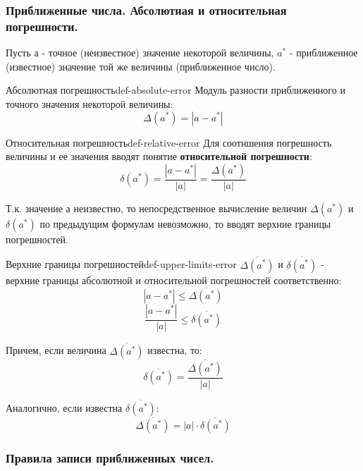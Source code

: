\documentclass[14pt]{extarticle}
\begin{document}
    \clearpage
    \subsubsection{Приближенные числа. Абсолютная и относительная погрешности.}
        
        Пусть $а$ - точное (неизвестное) значение некоторой величины, $a^{*}$ - приближенное (известное) значение той же величины (приближенное число).

        \begin{definition}{Абсолютная погрешность}{def-absolute-error}
            Модуль разности приближенного и точного значения некоторой величины:
            $$\Delta(a^{*}) = |a - a^{*}|$$
        \end{definition}

        \begin{definition}{Относительная погрешность}{def-relative-error}
            Для соотншения погрешность величины и ее значения вводят понятие \textbf{относительной погрешности}:
            $$\delta(a^{*}) = \frac{|a - a^{*}|}{|a|} = \frac{\Delta(a^{*})}{|a|}$$
        \end{definition}

        Т.к. значение $а$ неизвестно, то непосредственное вычисление величин $\Delta(a^{*})$ и $\delta(a^{*})$ по предыдущим формулам невозможно, то вводят верхние границы погрешностей.

        \begin{definition}{Верхние границы погрешностей}{def-upper-limits-error}
            $\overline{\Delta(a^{*})}$ и $\overline{\delta(a^{*})}$ - верхние границы абсолютной и относительной погрешностей соответственно:
            $$|a - a^{*}| \leq \overline{\Delta(a^{*})}$$
            $$\frac{|a - a^{*}|}{|a|} \leq \overline{\delta(a^{*})}$$

            Причем, если величина $\overline{\Delta(a^{*})}$ известна, то:
            $$\overline{\delta(a^{*})} = \frac{\overline{\Delta(a^{*})}}{|a|}$$

            Аналогично, если известна $\overline{\delta(a^{*})}$:
            $$\overline{\Delta(a^{*})} = |a| \cdot \overline{\delta(a^{*})}$$            
        \end{definition}

    \subsubsection{Правила записи приближенных чисел.}
        
\end{document}

